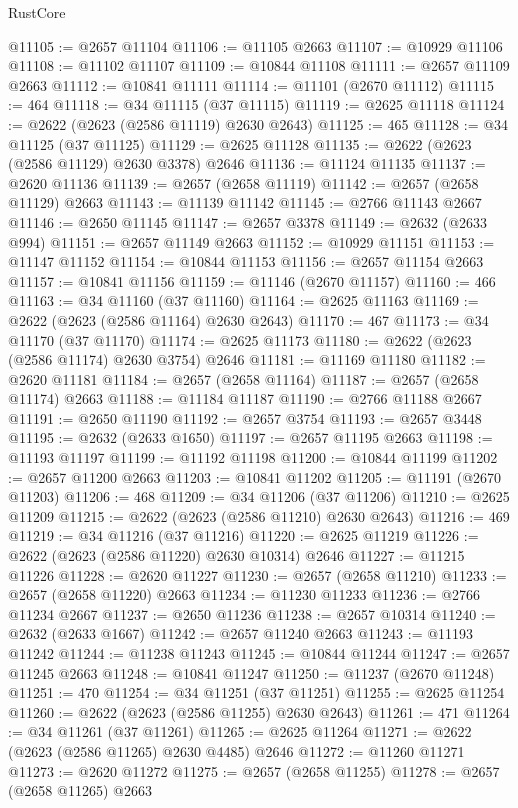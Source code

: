 \begin{lexlean}{RustCore}
\begin{coremodule}
@11105 := @2657 @11104
@11106 := @11105 @2663
@11107 := @10929 @11106
@11108 := @11102 @11107
@11109 := @10844 @11108
@11111 := @2657 @11109 @2663
@11112 := @10841 @11111
@11114 := @11101 (@2670 @11112)
@11115 := 464
@11118 := @34 @11115 (@37 @11115)
@11119 := @2625 @11118
@11124 := @2622 (@2623 (@2586 @11119) @2630 @2643)
@11125 := 465
@11128 := @34 @11125 (@37 @11125)
@11129 := @2625 @11128
@11135 := @2622 (@2623 (@2586 @11129) @2630 @3378) @2646
@11136 := @11124 @11135
@11137 := @2620 @11136
@11139 := @2657 (@2658 @11119)
@11142 := @2657 (@2658 @11129) @2663
@11143 := @11139 @11142
@11145 := @2766 @11143 @2667
@11146 := @2650 @11145
@11147 := @2657 @3378
@11149 := @2632 (@2633 @994)
@11151 := @2657 @11149 @2663
@11152 := @10929 @11151
@11153 := @11147 @11152
@11154 := @10844 @11153
@11156 := @2657 @11154 @2663
@11157 := @10841 @11156
@11159 := @11146 (@2670 @11157)
@11160 := 466
@11163 := @34 @11160 (@37 @11160)
@11164 := @2625 @11163
@11169 := @2622 (@2623 (@2586 @11164) @2630 @2643)
@11170 := 467
@11173 := @34 @11170 (@37 @11170)
@11174 := @2625 @11173
@11180 := @2622 (@2623 (@2586 @11174) @2630 @3754) @2646
@11181 := @11169 @11180
@11182 := @2620 @11181
@11184 := @2657 (@2658 @11164)
@11187 := @2657 (@2658 @11174) @2663
@11188 := @11184 @11187
@11190 := @2766 @11188 @2667
@11191 := @2650 @11190
@11192 := @2657 @3754
@11193 := @2657 @3448
@11195 := @2632 (@2633 @1650)
@11197 := @2657 @11195 @2663
@11198 := @11193 @11197
@11199 := @11192 @11198
@11200 := @10844 @11199
@11202 := @2657 @11200 @2663
@11203 := @10841 @11202
@11205 := @11191 (@2670 @11203)
@11206 := 468
@11209 := @34 @11206 (@37 @11206)
@11210 := @2625 @11209
@11215 := @2622 (@2623 (@2586 @11210) @2630 @2643)
@11216 := 469
@11219 := @34 @11216 (@37 @11216)
@11220 := @2625 @11219
@11226 := @2622 (@2623 (@2586 @11220) @2630 @10314) @2646
@11227 := @11215 @11226
@11228 := @2620 @11227
@11230 := @2657 (@2658 @11210)
@11233 := @2657 (@2658 @11220) @2663
@11234 := @11230 @11233
@11236 := @2766 @11234 @2667
@11237 := @2650 @11236
@11238 := @2657 @10314
@11240 := @2632 (@2633 @1667)
@11242 := @2657 @11240 @2663
@11243 := @11193 @11242
@11244 := @11238 @11243
@11245 := @10844 @11244
@11247 := @2657 @11245 @2663
@11248 := @10841 @11247
@11250 := @11237 (@2670 @11248)
@11251 := 470
@11254 := @34 @11251 (@37 @11251)
@11255 := @2625 @11254
@11260 := @2622 (@2623 (@2586 @11255) @2630 @2643)
@11261 := 471
@11264 := @34 @11261 (@37 @11261)
@11265 := @2625 @11264
@11271 := @2622 (@2623 (@2586 @11265) @2630 @4485) @2646
@11272 := @11260 @11271
@11273 := @2620 @11272
@11275 := @2657 (@2658 @11255)
@11278 := @2657 (@2658 @11265) @2663

\end{coremodule}
\end{lexlean}
